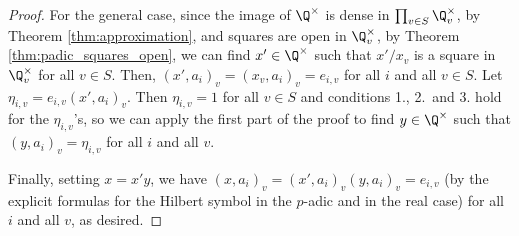 \begin{proof}
For the general case, since the image of $\Q^\times$ is dense in $\prod_{v \in S} \Q_v^\times$, by
Theorem \ref{thm:approximation}, and squares are open in $\Q_v^\times$, by Theorem \ref{thm:padic_squares_open},
we can find $x' \in \Q^\times$ such that $x'/x_v$ is a square in $\Q_v^\times$ for all $v \in S$.
Then, $(x', a_i)_v = (x_v, a_i)_v = e_{i,v}$ for all $i$ and all $v \in S$.
Let $\eta_{i,v}= e_{i,v} (x', a_i)_v$. Then $\eta_{i,v}=1$ for all $v \in S$ and conditions 1., 2.\
and 3. hold for the $\eta_{i,v}$'s, so we can apply the first part of the proof to find $y \in \Q^\times$
such that $(y, a_i)_v = \eta_{i,v}$ for all $i$ and all $v$.

Finally, setting $x = x' y$, we have $(x, a_i)_v = (x', a_i)_v (y, a_i)_v = e_{i,v}$ (by the explicit
formulas for the Hilbert symbol in the $p$-adic and in the real case) for all $i$ and all $v$, as desired.
\end{proof}
